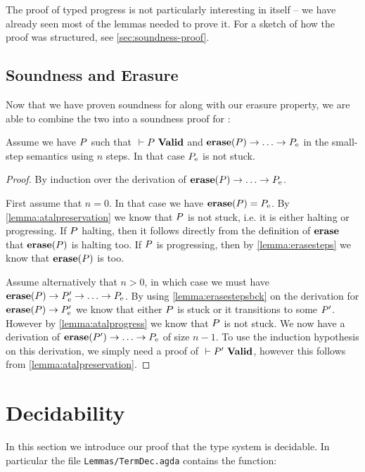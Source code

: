 The proof of typed progress is not particularly interesting in itself -- we have
already seen most of the lemmas needed to prove it. For a sketch of how the
proof was structured, see \cref{sec:soundness-proof}.

\subsection{Soundness and Erasure}

Now that we have proven soundness for \ATAL along with our erasure property, we
are able to combine the two into a soundness proof for \ATALe:

\begin{theorem}
  Assume we have $P$ such that ${} |- {P}\ \mathbf{Valid}$ and
  ${\mathbf{erase}}(P) -> \dots -> P_{\mathrm{e}}$ in the \ATALe small-step semantics
  using $n$ steps. In that case $P_{\mathrm{e}}$ is not stuck.
\end{theorem}
\begin{proof}
  By induction over the derivation of ${\mathbf{erase}}(P) -> \dots -> P_{\mathrm{e}}$.

  First assume that $n=0$. In that case we have ${\mathbf{erase}}(P) =
  P_{\mathrm{e}}$. By \cref{lemma:atalpreservation} we know that $P$ is not
  stuck, i.e. it is either halting or progressing. If $P$ halting, then it
  follows directly from the definition of ${\mathbf{erase}}$ that ${\mathbf{erase}}(P)$ is
  halting too. If $P$ is progressing, then by \cref{lemma:erasesteps} we
  know that ${\mathbf{erase}}(P)$ is too.

  Assume alternatively that $n>0$, in which case we must have
  ${\mathbf{erase}}(P) -> P'_{\mathrm{e}} -> \dots -> P_{\mathrm{e}}$. By using
  \cref{lemma:erasestepsbck} on the derivation for
  ${\mathbf{erase}}(P) -> P'_{\mathrm{e}}$ we know that either $P$ is stuck or it
  transitions to some $P'$. However by \cref{lemma:atalprogress} we know
  that $P$ is not stuck. We now have a derivation of
  ${\mathbf{erase}}(P') -> \dots -> P_{\mathrm{e}}$ of size $n-1$. To use the induction
  hypothesis on this derivation, we simply need a proof of ${} |- {P'}\ \mathbf{Valid}$,
  however this follows from \cref{lemma:atalpreservation}.
\end{proof}

\section{Decidability}
\label{sec:decidability}

In this section we introduce our proof that the type system is decidable. In
particular the file \texttt{Lemmas/TermDec.agda} contains the function:

